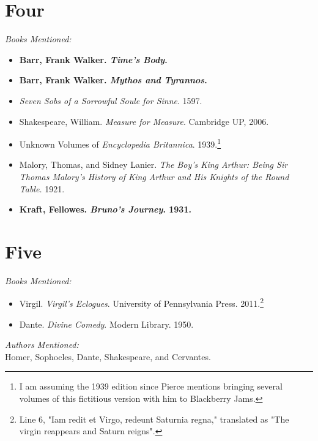 \documentclass[twoside,10pt]{report}
\begin{document}
\section{Four}
\textit{Books Mentioned:}
\begin{itemize}
\item \textbf{Barr, Frank Walker. \textit{Time’s Body}.}
\item \textbf{Barr, Frank Walker. \textit{Mythos and Tyrannos}.}
\item \textit{Seven Sobs of a Sorrowful Soule for Sinne}. 1597.\cite{SevenSobs}
\item Shakespeare, William. \textit{Measure for Measure}. Cambridge UP, 2006.\cite{Shakespeare2006}
\item Unknown Volumes of \textit{Encyclopedia Britannica}. 1939.\cite{Brit1939}\footnote{I am assuming the 1939 edition since Pierce mentions bringing several volumes of this fictitious version with him to Blackberry Jams.}
\item Malory, Thomas, and Sidney Lanier. \textit{The Boy’s King Arthur: Being Sir Thomas Malory’s History of King Arthur and His Knights of the Round Table.} 1921.\cite{Lanier1937}
\item \textbf{Kraft, Fellowes. \textit{Bruno’s Journey}. 1931.}
\end{itemize}

\section{Five}
\textit{Books Mentioned:}
\begin{itemize}
\item Virgil. \textit{Virgil’s Eclogues}. University of Pennsylvania Press. 2011.\cite{Virgil2011}\footnote{Line 6, "Iam redit et Virgo, redeunt Saturnia regna," translated as "The virgin reappears and Saturn reigns".}
\item Dante. \textit{Divine Comedy}. Modern Library. 1950.\cite{Dante1950}
\end{itemize}
\textit{Authors Mentioned:}\\
Homer, Sophocles, Dante, Shakespeare, and Cervantes.
\end{document}
